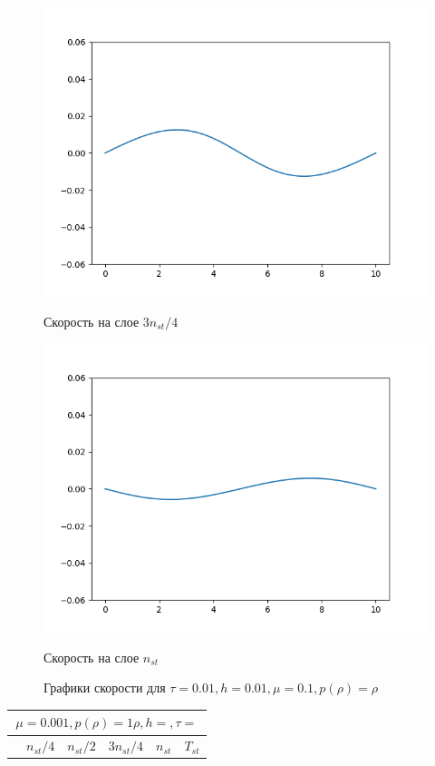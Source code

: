 \begin{figure}[h]
\begin{minipage}[h]{0.47\linewidth}
		\includegraphics[width=1\linewidth]{pics/task2/34u_1.png} 
		\caption{Скорость на слое $3n_{st} / 4$}
	\end{minipage}
	\hfill
	\begin{minipage}[h]{0.47\linewidth}
		\centering
		\includegraphics[width=1\linewidth]{pics/task2/44u_1.png} 
		\caption{Скорость на слое $n_{st}$}
	\end{minipage}
	\caption{Графики скорости для $\tau = 0.01, h = 0.01, \mu = 0.1, p(\rho) = \rho$}
\end{figure}

\begin{tabular}{*{6}{|l}|}
    \hline
     \\
    \hline
    &$n_{st}/4 $&$ n_{st}/2$&$3n_{st}/4$&$n_{st}$&$T_{st}$ \\
    \hline
\end{tabular}

